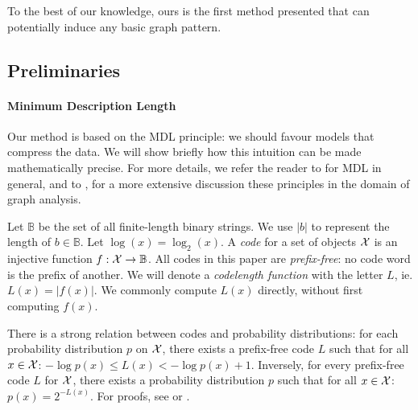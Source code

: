 \documentclass[runningheads]{style/llncs}
\newcommand{\B}{{\mathbb B}}
\begin{document}
To the best of our knowledge, ours is the first method presented that can potentially induce any basic graph pattern.

\subsection{Preliminaries}

\label{section:preliminaries}

\paragraph{Minimum Description Length}
Our method is based on the MDL principle: we should favour models that compress the data. We will show briefly how this intuition can be made mathematically precise. For more details, we refer the reader to \cite{grunwald2007minimum} for MDL in general, and to \cite{bloem2018tutorial}, for a more extensive discussion these principles in the domain of graph analysis.
 
Let $\B$ be the set of all finite-length binary strings. We use $|b|$ to represent the length of $b \in \B$. Let $\log(x) = \log_2(x)$. A \emph{code} for a set of objects $\cal X$  is an injective function $f: {\cal X} \to \B$. All codes in this paper are \emph{prefix-free}: no code word is the prefix of another. We will denote a \emph{codelength function} with the letter $L$, ie. $L(x) = |f(x)|$. We commonly compute $L(x)$ directly, without first computing $f(x)$.

There is a strong relation between codes and probability distributions: for each probability distribution $p$ on $\cal X$, there exists a prefix-free code $L$ such that for all $x \in \cal X$: $- \log p(x) \leq L(x) < -\log p(x) + 1$. Inversely, for every prefix-free code $L$ for $\cal X$, there exists a probability distribution $p$ such that for all $x \in \cal X$: $p(x) = 2^{-L(x)}$. For proofs, see \cite[Section~3.2.1]{grunwald2007minimum} or \cite[Theorem~5.2.1]{cover2006elements}.

\end{document}
